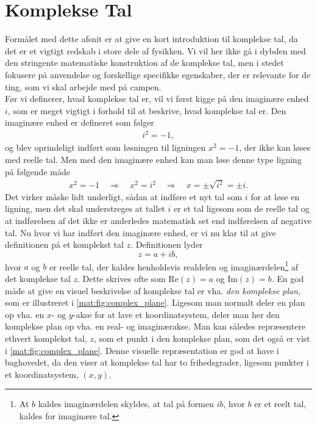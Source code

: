 \section{Komplekse Tal}

Formålet med dette afsnit er at give en kort introduktion til komplekse tal, da det er et vigtigt redskab i store dele af fysikken. Vi vil her ikke gå i dybden med den stringente matematiske konstruktion af de komplekse tal, men i stedet fokusere på anvendelse og forskellige specifikke egenskaber, der er relevante for de ting, som vi skal arbejde med på campen.\\

Før vi definerer, hvad komplekse tal er, vil vi først kigge på den imaginære enhed $i$, som er meget vigtigt i forhold til at beskrive, hvad komplekse tal er. Den imaginære enhed er defineret som følger
%
\begin{align}
    i^2 = -1,
\end{align}
%
og blev oprindeligt indført som løsningen til ligningen $x^2 = -1$, der ikke kan løses med reelle tal. Men med den imaginære enhed kan man løse denne type ligning på følgende måde
%
\begin{align}
    x^2 = -1 \quad \Rightarrow \quad x^2 = i^2 \quad \Rightarrow \quad x = \pm \sqrt{i^2} = \pm i.
\end{align}
%
Det virker måske lidt underligt, sådan at indføre et nyt tal som $i$ for at løse en ligning, men det skal understreges at tallet $i$ er et tal ligesom som de reelle tal og at indførelsen af det ikke er anderledes matematisk set end indførelsen af negative tal. Nu hvor vi har indført den imaginære enhed, er vi nu klar til at give definitionen på et komplekst tal $z$. Definitionen lyder 
\begin{equation}
    z = a+ib,
\label{mat:eq:kompleks_def}
\end{equation}  
hvor $a$ og $b$ er reelle tal, der kaldes henholdsvis realdelen og imaginærdelen\footnote{At $b$ kaldes imaginærdelen skyldes, at tal på formen $ib$, hvor $b$ er et reelt tal, kaldes for imaginære tal.} af det komplekse tal $z$.  Dette skrives ofte som $\text{Re}(z) = a$ og $\text{Im}(z) = b$. En god måde at give en visuel beskrivelse af komplekse tal er vha. \emph{den komplekse plan}, som er illustreret i \cref{mat:fig:complex_plane}. Ligesom man normalt deler en plan op vha. en  $x$- og $y$-akse for at lave et koordinatsystem, deler man her den komplekse plan op vha. en real- og imaginærakse. Man kan således repræsentere ethvert komplekst tal, $z$, som et punkt i den komplekse plan, som det også er vist i \cref{mat:fig:complex_plane}. Denne visuelle repræsentation er god at have i baghovedet, da den viser at komplekse tal har to frihedsgrader, ligesom punkter i et koordinatsystem, $(x,y)$.
